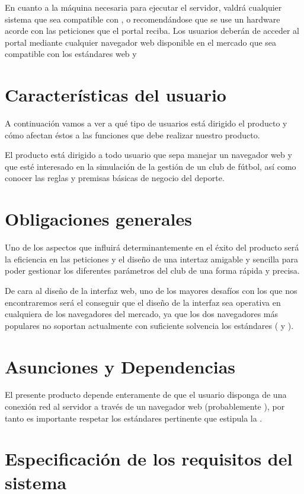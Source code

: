 En cuanto a la máquina necesaria para ejecutar el servidor, valdrá cualquier
sistema que sea compatible con ,  o
 recomendándose que se use un hardware acorde con las
peticiones que el portal reciba. Los usuarios deberán de acceder al portal
mediante cualquier navegador web disponible en el mercado que sea compatible con
los estándares web  y 

\section{Características del usuario}
A continuación vamos a ver a qué tipo de usuarios está dirigido el producto y
cómo afectan éstos a las funciones que debe realizar nuestro producto.

El producto está dirigido a todo usuario que sepa manejar un navegador web y que
esté interesado en la simulación de la gestión de un club de fútbol, así como
conocer las reglas y premisas básicas de negocio del deporte.
\section{Obligaciones generales}
Uno de los aspectos que influirá determinantemente en el éxito del producto será
la eficiencia en las peticiones y el diseño de una intertaz amigable y sencilla
para poder gestionar los diferentes parámetros del club de una forma rápida y
precisa.

De cara al diseño de la interfaz web, uno de los mayores desafíos con los que
nos encontraremos será el conseguir que el diseño de la interfaz sea operativa
en cualquiera de los navegadores del mercado, ya que los dos navegadores más
populares no soportan actualmente con suficiente solvencia los estándares
 ( y ).
\section{Asunciones y Dependencias}
El presente producto depende enteramente de que el usuario disponga de una
conexión red al servidor a través de un navegador web (probablemente
), por tanto es importante respetar los estándares pertinente
que estipula la .

\section{Especificación de los requisitos del sistema}
